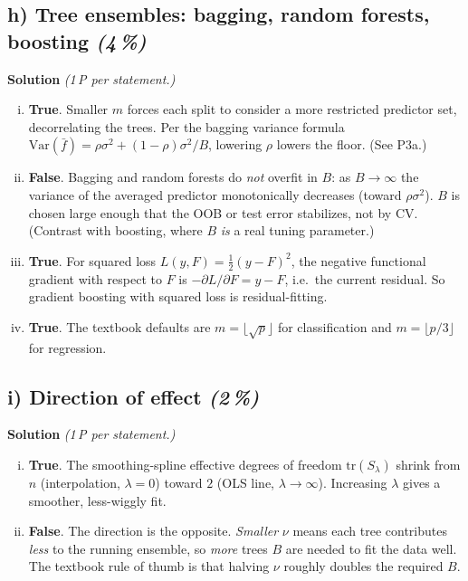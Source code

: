 \documentclass[11pt,a4paper]{article}
\newcommand{\subpoints}[1]{\textit{(#1\,\%)}}
\newcommand{\sol}{\noindent\textbf{Solution}}
\begin{document}
\subsection*{h) Tree ensembles: bagging, random forests, boosting \subpoints{4}}
\sol{} \emph{(1\,P per statement.)}
\begin{enumerate}[(i)]
  \item \textbf{True}. Smaller $m$ forces each split to consider a more restricted predictor set, decorrelating
        the trees. Per the bagging variance formula
        $\mathrm{Var}(\bar f)=\rho\sigma^2+(1-\rho)\sigma^2/B$, lowering $\rho$ lowers the floor. (See P3a.)
  \item \textbf{False}. Bagging and random forests do \emph{not} overfit in $B$: as $B\to\infty$ the variance
        of the averaged predictor monotonically decreases (toward $\rho\sigma^2$). $B$ is chosen large enough
        that the OOB or test error stabilizes, not by CV. (Contrast with boosting, where $B$ \emph{is} a real
        tuning parameter.)
  \item \textbf{True}. For squared loss $L(y,F)=\tfrac12(y-F)^2$, the negative functional gradient with
        respect to $F$ is $-\partial L/\partial F = y - F$, i.e.\ the current residual. So gradient boosting
        with squared loss is residual-fitting.
  \item \textbf{True}. The textbook defaults are $m=\lfloor\sqrt p\rfloor$ for classification and
        $m=\lfloor p/3\rfloor$ for regression.
\end{enumerate}

\subsection*{i) Direction of effect \subpoints{2}}
\sol{} \emph{(1\,P per statement.)}
\begin{enumerate}[(i)]
  \item \textbf{True}. The smoothing-spline effective degrees of freedom $\mathrm{tr}(S_\lambda)$ shrink from
        $n$ (interpolation, $\lambda=0$) toward $2$ (OLS line, $\lambda\to\infty$). Increasing $\lambda$ gives
        a smoother, less-wiggly fit.
  \item \textbf{False}. The direction is the opposite. \emph{Smaller} $\nu$ means each tree contributes \emph{less}
        to the running ensemble, so \emph{more} trees $B$ are needed to fit the data well. The textbook rule of
        thumb is that halving $\nu$ roughly doubles the required $B$.
\end{enumerate}
\end{document}
